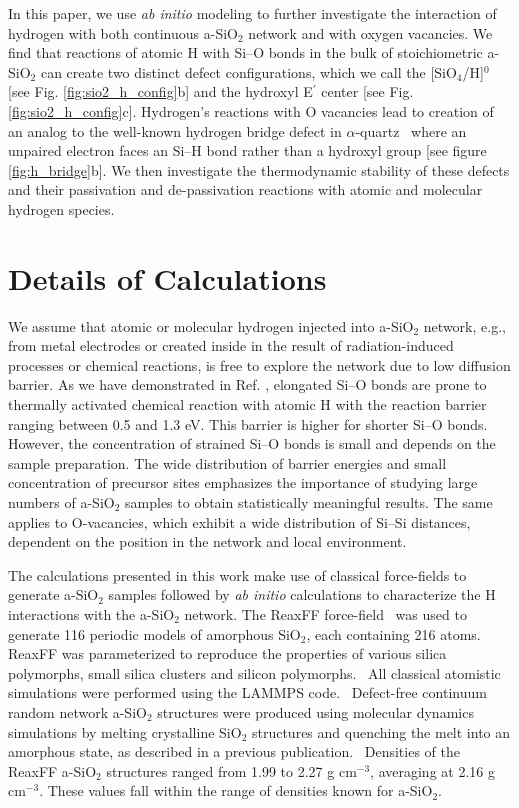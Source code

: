 \documentclass[aps,prb,reprint,superscriptaddress,showpacs]{revtex4-1}
\begin{document}
In this paper, we use \emph{ab initio} modeling to further investigate the interaction of hydrogen with both continuous a-SiO$_2$ network and with oxygen vacancies. We find that reactions of atomic H with \mbox{Si--O} bonds in the bulk of stoichiometric a-SiO$_2$ can create two distinct defect configurations, which we call the [SiO$_4$/H]$^0$ [see Fig. \ref{fig:sio2_h_config}b] and the hydroxyl E$^\prime$ center [see Fig. \ref{fig:sio2_h_config}c]. Hydrogen's reactions with O vacancies lead to creation of an analog to the well-known hydrogen bridge defect in $\alpha$-quartz~\cite{blochl_vacancies,alkauskas_h} where an unpaired electron faces an \mbox{Si--H} bond rather than a hydroxyl group [see figure \ref{fig:h_bridge}b]. We then investigate the thermodynamic stability of these defects and their passivation and de-passivation reactions with atomic and molecular hydrogen species. 

\section{Details of Calculations}
\label{sec:calc_details}

We assume that atomic or molecular hydrogen injected into a-SiO$_2$ network, e.g., from metal electrodes or created inside in the result of radiation-induced processes or chemical reactions, is free to explore the network due to low diffusion barrier. As we have demonstrated in Ref. \cite{aelsayed_prl}, elongated \mbox{Si--O} bonds are prone to thermally activated chemical reaction with atomic H with the reaction barrier ranging between 0.5 and 1.3 eV. This barrier is higher for shorter \mbox{Si--O} bonds. However, the concentration of strained \mbox{Si--O} bonds is small and depends on the sample preparation. The wide distribution of barrier energies and small concentration of precursor sites emphasizes the importance of studying large numbers of a-SiO$_2$ samples to obtain statistically meaningful results. The same applies to O-vacancies, which exhibit a wide distribution of \mbox{Si--Si} distances, dependent on the position in the network and local environment.~\cite{asio2_3}

The calculations presented in this work make use of classical force-fields to generate a-SiO$_2$ samples followed by \emph{ab initio} calculations to characterize the H interactions with the a-SiO$_2$ network. The ReaxFF force-field~\cite{reaxff_sisio} was used to generate 116 periodic models of amorphous SiO$_{2}$, each containing 216 atoms. ReaxFF was parameterized to reproduce the properties of various silica polymorphs, small silica clusters and silicon polymorphs.~\cite{reaxff_h2o} All classical atomistic simulations were performed using the LAMMPS code.~\cite{lammps} Defect-free continuum random network a-SiO$_2$ structures were produced using molecular dynamics simulations by melting crystalline SiO$_2$ structures and quenching the melt into an amorphous state, as described in a previous publication.~\cite{aelsayed_prb} Densities of the ReaxFF a-SiO$_2$ structures ranged from 1.99 to 2.27 g cm$^{-3}$, averaging at 2.16 g cm$^{-3}$. These values fall within the range of densities known for a-SiO$_2$.  
\end{document}
